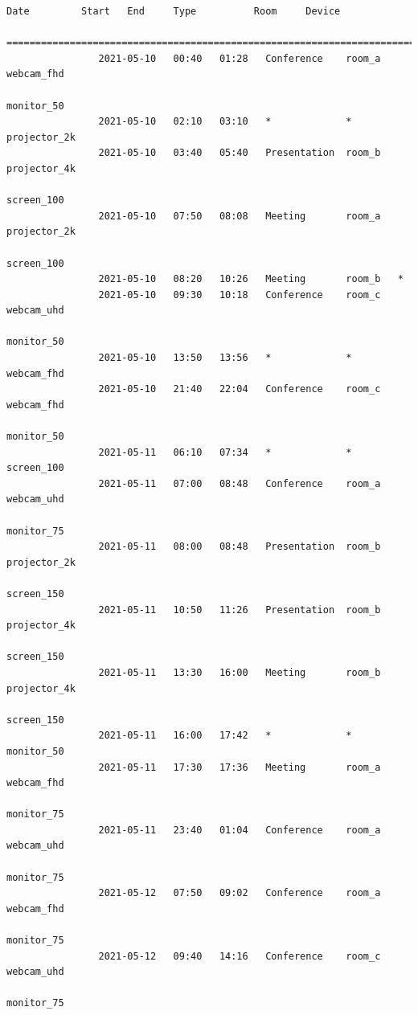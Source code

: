 \documentclass{article}
\begin{document}
\begin{Verbatim}[gobble=8]
                Date         Start   End     Type          Room     Device
                ===========================================================================
                2021-05-10   00:40   01:28   Conference    room_a   webcam_fhd
                                                                    monitor_50
                2021-05-10   02:10   03:10   *             *        projector_2k
                2021-05-10   03:40   05:40   Presentation  room_b   projector_4k
                                                                    screen_100
                2021-05-10   07:50   08:08   Meeting       room_a   projector_2k
                                                                    screen_100
                2021-05-10   08:20   10:26   Meeting       room_b   *
                2021-05-10   09:30   10:18   Conference    room_c   webcam_uhd
                                                                    monitor_50
                2021-05-10   13:50   13:56   *             *        webcam_fhd
                2021-05-10   21:40   22:04   Conference    room_c   webcam_fhd
                                                                    monitor_50
                2021-05-11   06:10   07:34   *             *        screen_100
                2021-05-11   07:00   08:48   Conference    room_a   webcam_uhd
                                                                    monitor_75
                2021-05-11   08:00   08:48   Presentation  room_b   projector_2k
                                                                    screen_150
                2021-05-11   10:50   11:26   Presentation  room_b   projector_4k
                                                                    screen_150
                2021-05-11   13:30   16:00   Meeting       room_b   projector_4k
                                                                    screen_150
                2021-05-11   16:00   17:42   *             *        monitor_50
                2021-05-11   17:30   17:36   Meeting       room_a   webcam_fhd
                                                                    monitor_75
                2021-05-11   23:40   01:04   Conference    room_a   webcam_uhd
                                                                    monitor_75
                2021-05-12   07:50   09:02   Conference    room_a   webcam_fhd
                                                                    monitor_75
                2021-05-12   09:40   14:16   Conference    room_c   webcam_uhd
                                                                    monitor_75

\end{Verbatim}
\end{document}
